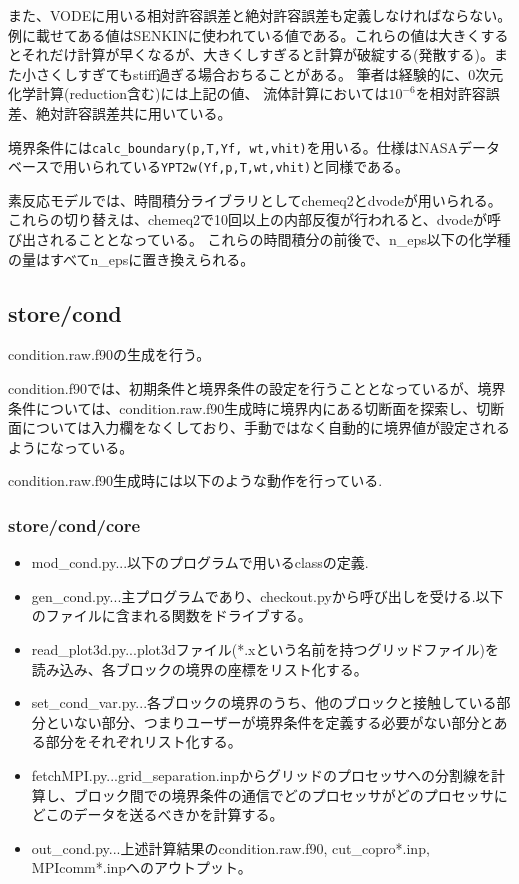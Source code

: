 \documentclass{jsarticle}
\begin{document}
また、VODEに用いる相対許容誤差と絶対許容誤差も定義しなければならない。例に載せてある値はSENKINに使われている値である。これらの値は大きくするとそれだけ計算が早くなるが、大きくしすぎると計算が破綻する(発散する)。また小さくしすぎてもstiff過ぎる場合おちることがある。
筆者は経験的に、0次元化学計算(reduction含む)には上記の値、
流体計算においては$10^{-6}$を相対許容誤差、絶対許容誤差共に用いている。

境界条件には\verb|calc_boundary(p,T,Yf, wt,vhit)|を用いる。仕様はNASAデータベースで用いられている\verb|YPT2w(Yf,p,T,wt,vhit)|と同様である。

素反応モデルでは、時間積分ライブラリとしてchemeq2とdvodeが用いられる。
これらの切り替えは、chemeq2で10回以上の内部反復が行われると、dvodeが呼び出されることとなっている。
これらの時間積分の前後で、n\_eps以下の化学種の量はすべてn\_epsに置き換えられる。
\subsection{store/cond}%
condition.raw.f90の生成を行う。

condition.f90では、初期条件と境界条件の設定を行うこととなっているが、境界条件については、condition.raw.f90生成時に境界内にある切断面を探索し、切断面については入力欄をなくしており、手動ではなく自動的に境界値が設定されるようになっている。

condition.raw.f90生成時には以下のような動作を行っている.
\subsubsection{store/cond/core}
\begin{itemize}
\item mod\_cond.py...以下のプログラムで用いるclassの定義.
\item gen\_cond.py...主プログラムであり、checkout.pyから呼び出しを受ける.以下のファイルに含まれる関数をドライブする。
\item read\_plot3d.py...plot3dファイル(*.xという名前を持つグリッドファイル)を読み込み、各ブロックの境界の座標をリスト化する。
\item set\_cond\_var.py...各ブロックの境界のうち、他のブロックと接触している部分といない部分、つまりユーザーが境界条件を定義する必要がない部分とある部分をそれぞれリスト化する。
\item fetchMPI.py...grid\_separation.inpからグリッドのプロセッサへの分割線を計算し、ブロック間での境界条件の通信でどのプロセッサがどのプロセッサにどこのデータを送るべきかを計算する。
\item out\_cond.py...上述計算結果のcondition.raw.f90, cut\_copro*.inp, MPIcomm*.inpへのアウトプット。
\end{itemize}
\end{document}
